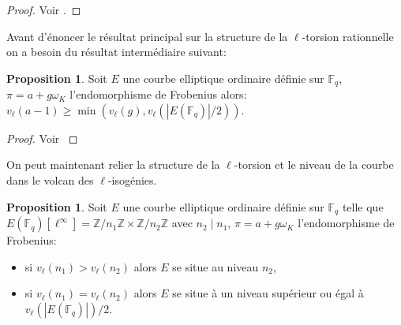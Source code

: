 \documentclass[10pt,a4paper]{book}
\theoremstyle{plain}
\theoremstyle{definition}
\theoremstyle{definition}
\theoremstyle{definition}
\theoremstyle{definition}
\newtheorem{prop}[thm]{Proposition}
\theoremstyle{definition}
\theoremstyle{remark}
\theoremstyle{remark}
\theoremstyle{definition}
\begin{document}
\begin{proof}
Voir  \cite[Lemma 1]{Ruck1987}.
\end{proof}

Avant d'énoncer le résultat principal sur la structure de la $\ell$-torsion rationnelle on a besoin du résultat intermédiaire suivant:

\begin{prop}
Soit $E$ une courbe elliptique ordinaire définie sur $\mathbb{F}_q$, $\pi=a+g \omega_K$ l'endomorphisme de Frobenius alors: $v_{\ell}(a-1) \geqslant \min(v_{\ell}(g),v_{\ell}(|E(\mathbb{F}_q)|/2))$.
\end{prop}

\begin{proof}
Voir \cite[Lemma 5.2]{Ionica2010}
\end{proof}

On peut maintenant relier la structure de la $\ell$-torsion et le niveau de la courbe dans le volcan des $\ell$-isogénies.

\begin{prop}
\label{pro:niv:str}
Soit $E$ une courbe elliptique ordinaire définie sur $\mathbb{F}_q$ telle que 
$E(\mathbb{F}_q)[\ell^{\infty}]=\mathbb{Z}/n_1\mathbb{Z} \times
\mathbb{Z}/n_2\mathbb{Z}$ avec $n_2 \mid n_1$, $\pi = a + g \omega_K$ 
l'endomorphisme de Frobenius: 
\begin{itemize}
\item si $v_{\ell}(n_1)>v_{\ell}(n_2)$ alors $E$ se situe au niveau $n_2$,
\item si $v_{\ell}(n_1)=v_{\ell}(n_2)$ alors $E$ se situe à un niveau supérieur ou égal à $v_{\ell}(|E(\mathbb{F}_q)|)/2$.
\end{itemize}
\end{prop}
\end{document}
